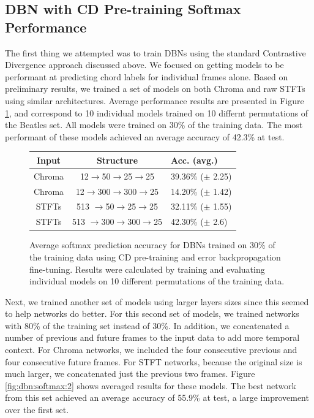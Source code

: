 \documentclass{article}
\begin{document}
\subsection{DBN with CD Pre-training Softmax Performance}

The first thing we attempted was to train DBNs using the standard Contrastive
Divergence approach discussed above. We focused on getting models to be
performant at predicting chord labels for individual frames alone. Based on
preliminary results, we trained a set of models on both Chroma and raw STFTs
using similar architectures.  Average performance results are presented in
Figure \ref{fig:dbn:softmax}, and correspond to 10 individual models trained on
10 differnt permutations of the Beatles set. All models were trained on 30\% of
the training data. The most performant of these models achieved an average
accuracy of 42.3\% at test.

\begin{figure}
\begin{center}
\begin{tabular}{c|c|l}
Input & Structure & Acc. (avg.) \\
\hline
Chroma & 12$\rightarrow$50$\rightarrow$25$\rightarrow$25 & 39.36\% ($\pm$ 2.25) \\
Chroma & 12$\rightarrow$300$\rightarrow$300$\rightarrow$25 & 14.20\% ($\pm$ 1.42) \\
STFTs & 513 $\rightarrow$50$\rightarrow$25$\rightarrow$25 & 32.11\% ($\pm$ 1.55) \\
STFTs & 513 $\rightarrow$300$\rightarrow$300$\rightarrow$25 & 42.30\% ($\pm$ 2.6) \\
\end{tabular}
\label{fig:dbn:softmax}
\end{center}

\caption{Average softmax prediction accuracy for DBNs trained on 30\% of the
training data using CD pre-training and error backpropagation fine-tuning.
Results were calculated by training and evaluating individual models on 10
different permutations of the training data.}

\end{figure}

Next, we trained another set of models using larger layers sizes since this
seemed to help networks do better. For this second set of models, we trained
networks with 80\% of the training set instead of 30\%. In addition, we
concatenated a number of previous and future frames to the input data to add
more temporal context. For Chroma networks, we included the four consecutive
previous and four consecutive future frames. For STFT networks, because the
original size is much larger, we concatenated just the previous two frames.
Figure \ref{fig:dbn:softmax:2} shows averaged results for these models. The
best network from this set achieved an average accuracy of 55.9\% at test, a
large improvement over the first set.
\end{document}
